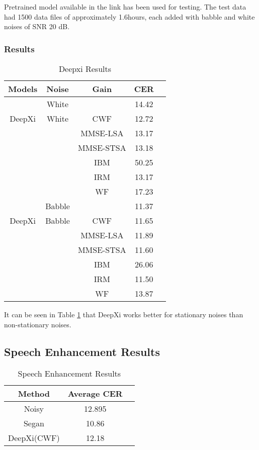 \documentclass[12pt]{article}
\begin{document}
Pretrained model available in the link  has been used for testing.
The test data had 1500 data files of approximately 1.6hours, each added with babble and white noises of SNR 20 dB.

\subsubsection{Results}

\begin{table} [h!]
	\centering
		\caption{ Deepxi Results }
\label{tab:Deepxi}
\begin{tabular}{ | c || c || c || c | c | }
\hline Models & Noise & Gain & CER\\ 
\hline
\hline  & White &  & 14.42 \\
\hline  DeepXi & White & CWF & 12.72\\
\hline  &  & MMSE-LSA & 13.17\\
\hline  &  & MMSE-STSA & 13.18\\
\hline  &  & IBM & 50.25\\
\hline  &  & IRM & 13.17\\
\hline  &  & WF & 17.23\\
\hline
\hline  & Babble & & 11.37\\
\hline DeepXi & Babble & CWF & 11.65\\
\hline  &  & MMSE-LSA & 11.89\\
\hline  &  & MMSE-STSA & 11.60\\
\hline  &  & IBM & 26.06\\
\hline  &  & IRM & 11.50\\
\hline  &  & WF & 13.87\\
\hline

\end{tabular}
\end{table}

It can be seen in Table \ref{tab:Deepxi} that DeepXi works better for stationary noises than non-stationary noises.
\newpage
\subsection{Speech Enhancement Results}

\begin{table} [h!]
	\centering
		\caption{ Speech Enhancement Results }
\label{tab: Speech Enhancement Results}
\begin{tabular}{ | c || c | c | }
\hline Method & Average CER\\ 
\hline
\hline Noisy & 12.895\\
\hline Segan & 10.86 \\
\hline DeepXi(CWF) & 12.18\\
\hline
\end{tabular}
\end{table}
\end{document}
